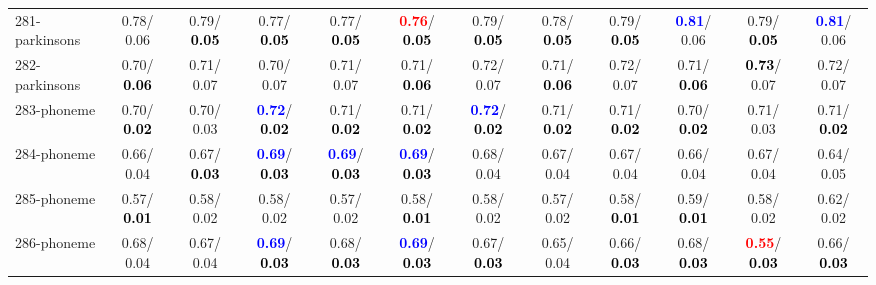 \begin{table}[h]
\begin{center}
{\begin{tabular}{lc|c|c|c|c|c|c|c|c|c|c}
281-parkinsons &   0.78/  0.06 &   0.79/\textcolor{black}{\textbf{  0.05}} &   0.77/\textcolor{black}{\textbf{  0.05}} &   0.77/\textcolor{black}{\textbf{  0.05}} & \textcolor{red}{\textbf{  0.76}}/\textcolor{black}{\textbf{  0.05}} &   0.79/\textcolor{black}{\textbf{  0.05}} &   0.78/\textcolor{black}{\textbf{  0.05}} &   0.79/\textcolor{black}{\textbf{  0.05}} & \textcolor{blue}{\textbf{  0.81}}/  0.06 &   0.79/\textcolor{black}{\textbf{  0.05}} & \textcolor{blue}{\textbf{  0.81}}/  0.06 \\
282-parkinsons &   0.70/\textcolor{black}{\textbf{  0.06}} &   0.71/  0.07 &   0.70/  0.07 &   0.71/  0.07 &   0.71/\textcolor{black}{\textbf{  0.06}} &   0.72/  0.07 &   0.71/\textcolor{black}{\textbf{  0.06}} &   0.72/  0.07 &   0.71/\textcolor{black}{\textbf{  0.06}} & \textcolor{black}{\textbf{  0.73}}/  0.07 &   0.72/  0.07 \\
283-phoneme &   0.70/\textcolor{black}{\textbf{  0.02}} &   0.70/  0.03 & \textcolor{blue}{\textbf{  0.72}}/\textcolor{black}{\textbf{  0.02}} &   0.71/\textcolor{black}{\textbf{  0.02}} &   0.71/\textcolor{black}{\textbf{  0.02}} & \textcolor{blue}{\textbf{  0.72}}/\textcolor{black}{\textbf{  0.02}} &   0.71/\textcolor{black}{\textbf{  0.02}} &   0.71/\textcolor{black}{\textbf{  0.02}} &   0.70/\textcolor{black}{\textbf{  0.02}} &   0.71/  0.03 &   0.71/\textcolor{black}{\textbf{  0.02}} \\
284-phoneme &   0.66/  0.04 &   0.67/\textcolor{black}{\textbf{  0.03}} & \textcolor{blue}{\textbf{  0.69}}/\textcolor{black}{\textbf{  0.03}} & \textcolor{blue}{\textbf{  0.69}}/\textcolor{black}{\textbf{  0.03}} & \textcolor{blue}{\textbf{  0.69}}/\textcolor{black}{\textbf{  0.03}} &   0.68/  0.04 &   0.67/  0.04 &   0.67/  0.04 &   0.66/  0.04 &   0.67/  0.04 &   0.64/  0.05 \\ \hline
285-phoneme &   0.57/\textcolor{black}{\textbf{  0.01}} &   0.58/  0.02 &   0.58/  0.02 &   0.57/  0.02 &   0.58/\textcolor{black}{\textbf{  0.01}} &   0.58/  0.02 &   0.57/  0.02 &   0.58/\textcolor{black}{\textbf{  0.01}} &   0.59/\textcolor{black}{\textbf{  0.01}} &   0.58/  0.02 &   0.62/  0.02 \\
286-phoneme &   0.68/  0.04 &   0.67/  0.04 & \textcolor{blue}{\textbf{  0.69}}/\textcolor{black}{\textbf{  0.03}} &   0.68/\textcolor{black}{\textbf{  0.03}} & \textcolor{blue}{\textbf{  0.69}}/\textcolor{black}{\textbf{  0.03}} &   0.67/\textcolor{black}{\textbf{  0.03}} &   0.65/  0.04 &   0.66/\textcolor{black}{\textbf{  0.03}} &   0.68/\textcolor{black}{\textbf{  0.03}} & \textcolor{red}{\textbf{  0.55}}/\textcolor{black}{\textbf{  0.03}} &   0.66/\textcolor{black}{\textbf{  0.03}} \\

\end{tabular}}
\end{center}
\end{table}
